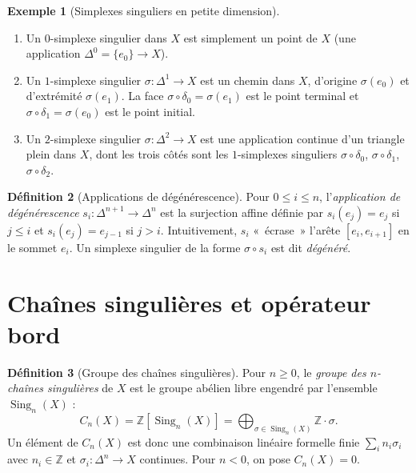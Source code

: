 \documentclass[12pt,a4paper,openany]{book}
\theoremstyle{definition}
\newtheorem{definition}{Définition}[chapter]
\newtheorem{exemple}[definition]{Exemple}
\theoremstyle{plain}
\theoremstyle{remark}
\newcommand{\Z}{\mathbb{Z}}
\begin{document}
\begin{exemple}[Simplexes singuliers en petite dimension]\label{ex:simplexes-petite-dim}
\begin{enumerate}[label=(\roman*)]
  \item Un $0$-simplexe singulier dans $X$ est simplement un point de $X$ (une application
  $\Delta^0 = \{e_0\} \to X$).
  \item Un $1$-simplexe singulier $\sigma \colon \Delta^1 \to X$ est un chemin dans $X$,
  d'origine $\sigma(e_0)$ et d'extrémité $\sigma(e_1)$. La face $\sigma \circ \delta_0 = \sigma(e_1)$
  est le point terminal et $\sigma \circ \delta_1 = \sigma(e_0)$ est le point initial.
  \item Un $2$-simplexe singulier $\sigma \colon \Delta^2 \to X$ est une application continue
  d'un triangle plein dans $X$, dont les trois côtés sont les $1$-simplexes singuliers
  $\sigma \circ \delta_0$, $\sigma \circ \delta_1$, $\sigma \circ \delta_2$.
\end{enumerate}
\end{exemple}

\begin{definition}[Applications de dégénérescence]\label{def:degenerescence}
Pour $0 \leq i \leq n$, l'\emph{application de dégénérescence} $s_i \colon \Delta^{n+1} \to \Delta^n$
est la surjection affine définie par $s_i(e_j) = e_j$ si $j \leq i$ et $s_i(e_j) = e_{j-1}$ si $j > i$.
Intuitivement, $s_i$ «~écrase~» l'arête $[e_i, e_{i+1}]$ en le sommet $e_i$.
Un simplexe singulier de la forme $\sigma \circ s_i$ est dit \emph{dégénéré}.
\end{definition}

\section{Chaînes singulières et opérateur bord}\label{sec:chaines-singulieres}

\begin{definition}[Groupe des chaînes singulières]\label{def:chaines-singulieres}
Pour $n \geq 0$, le \emph{groupe des $n$-chaînes singulières} de $X$ est le groupe abélien libre
engendré par l'ensemble $\operatorname{Sing}_n(X)$ :
\[
  C_n(X) = \Z[\operatorname{Sing}_n(X)] = \bigoplus_{\sigma \in \operatorname{Sing}_n(X)} \Z \cdot \sigma.
\]
Un élément de $C_n(X)$ est donc une combinaison linéaire formelle finie
$\sum_{i} n_i \sigma_i$ avec $n_i \in \Z$ et $\sigma_i \colon \Delta^n \to X$ continues.
Pour $n < 0$, on pose $C_n(X) = 0$.
\end{definition}
\end{document}
